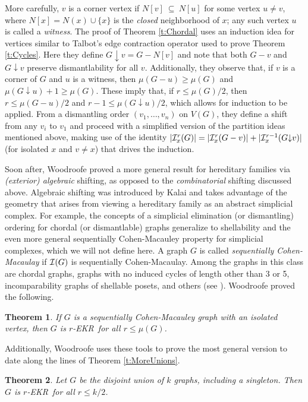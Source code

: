 \documentclass{article}
\newtheorem{thm}{Theorem}%
\def\m{{\mu}}
\def\cI{{\cal I}}
\def\ekr{{\sf EKR}}
\def\da{{\downarrow}}
\def\sse{{\subseteq}}
\begin{document}
More carefully, $v$ is a corner vertex if $N[v]\ \sse\ N[u]$ for some vertex $u\not=v$, where $N[x]=N(x)\cup\{x\}$ is the {\it closed} neighborhood of $x$; any such vertex $u$ is called a {\it witness}.
The proof of Theorem \ref{t:Chordal} uses an induction idea for vertices similar to Talbot's edge contraction operator used to prove Theorem \ref{t:Cycles}.
Here they define $G\da v=G-N[v]$ and note that both $G-v$ and $G\da v$ preserve dismantlability for all $v$.
Additionally, they observe that, if $v$ is a corner of $G$ and $u$ is a witness, then $\m(G-u)\ge\m(G)$ and $\m(G\da u)+1\ge\m(G)$.
These imply that, if $r\le\m(G)/2$, then $r\le\m(G-u)/2$ and $r-1\le\m(G\da u)/2$, which allows for induction to be applied.
From a dismantling order $(v_1,\ldots,v_n)$ on $V(G)$, they define a shift from any $v_i$ to $v_1$ and proceed with a simplified version of the partition ideas mentioned above, making use of the identity $|\cI_x^r(G)| = |\cI_x^r(G-v)|+|\cI_x^{r-1}(G\da v)|$ (for isolated $x$ and $v\not=x$) that drives the induction.

Soon after, Woodroofe \cite{WoodroofeSimp} proved a more general result for hereditary families via {\it (exterior) algebraic} shifting, as opposed to the {\it combinatorial} shifting discussed above.
Algebraic shifting was introduced by Kalai \cite{Kalai} and takes advantage of the geometry that arises from viewing a hereditary family as an abstract simplicial complex.
For example, the concepts of a simplicial elimination (or dismantling) ordering for chordal (or dismantlable) graphs generalize to shellability and the even more general sequentially Cohen-Macauley property for simplicial complexes, which we will not define here.
A graph $G$ is called {\it sequentially Cohen-Macaulay} if $\cI(G)$ is sequentially Cohen-Macaulay.
Among the graphs in this class are chordal graphs, graphs with no induced cycles of length other than 3 or 5, incomparability graphs of shellable posets, and others (see \cite{WoodroofeSimp}).
Woodroofe proved the following.

\begin{thm}
\label{t:CohMac}
If $G$ is a sequentially Cohen-Macauley graph with an isolated vertex, then $G$ is $r$-\ekr\ for all $r\le\m(G)$.
\end{thm}

Additionally, Woodroofe uses these tools to prove the most general version to date along the lines of Theorem \ref{t:MoreUnions}.

\begin{thm}
\label{t:MostUnions}
Let $G$ be the disjoint union of $k$ graphs, including a singleton.
Then $G$ is $r$-\ekr\ for all $r\le k/2$.
\end{thm}
\end{document}
